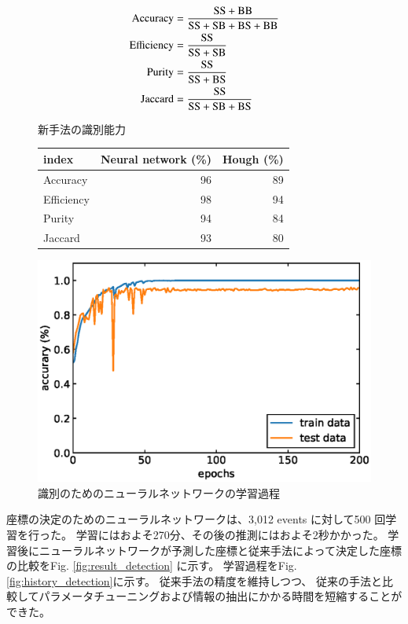 \documentclass{jps-cp}
\makeatletter
\newcommand{\tblcaption}[1]{\def\@captype{table}\caption{#1}}
\makeatother
\begin{document}
\begin{align}
  \rm{Accuracy} &= \frac{\rm{SS}+\rm{BB}}{\rm{SS}+\rm{SB}+\rm{BS}+\rm{BB}} \label{eq:acc}\\
  \rm{Efficiency} &= \frac{\rm{SS}}{\rm{SS}+\rm{SB}}\\
  \rm{Purity} &= \frac{\rm{SS}}{\rm{SS}+\rm{BS}}\\
  \rm{Jaccard} &= \frac{\rm{SS}}{\rm{SS}+\rm{SB}+\rm{BS}} \label{eq:jac}
\end{align}

\begin{figure}
  \begin{minipage}{0.45\columnwidth}
    \centering
    \tblcaption{新手法の識別能力}
    \label{tab:result_selection}
    \begin{tabular}{lrr}
      \toprule
      index & Neural network (\%) & Hough (\%) \\ \midrule
      Accuracy & 96 & 89 \\
      Efficiency & 98 & 94 \\
      Purity & 94 & 84 \\
      Jaccard & 93 & 80 \\ \bottomrule
    \end{tabular}
  \end{minipage}
  \hfill
  \begin{minipage}{0.45\columnwidth}
    \centering
    \includegraphics[clip,width=0.8\columnwidth]{eps/event_selection_history.eps}
    \caption{識別のためのニューラルネットワークの学習過程}
    \label{fig:history_selection}
  \end{minipage}
\end{figure}

座標の決定のためのニューラルネットワークは、3,012 events に対して500 回学習を行った。
学習にはおよそ270分、その後の推測にはおよそ2秒かかった。
学習後にニューラルネットワークが予測した座標と従来手法によって決定した座標の比較をFig. \ref{fig:result_detection} に示す。
学習過程をFig. \ref{fig:history_detection}に示す。
従来手法の精度を維持しつつ、
従来の手法と比較してパラメータチューニングおよび情報の抽出にかかる時間を短縮することができた。
\end{document}
